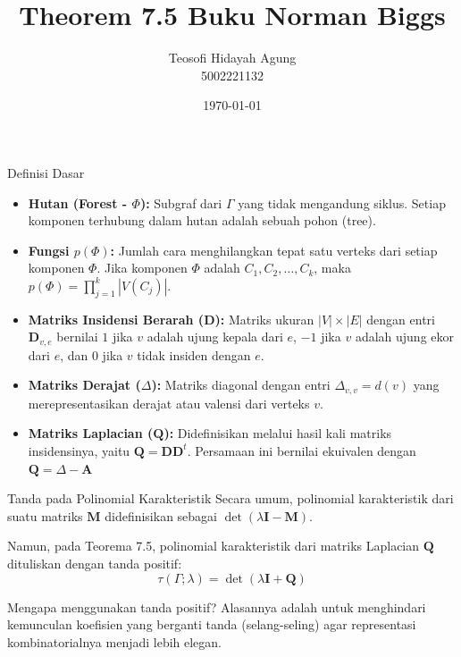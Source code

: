 \documentclass[aspectratio=169]{beamer}
\date{\today}
\title[Aljabar Graf]{Theorem 7.5 Buku Norman Biggs}
\author[Teosofi H.\ A.]{Teosofi Hidayah Agung \\ 5002221132}
\institute[Matematika ITS]{Departemen Matematika\\ Institut Teknologi Sepuluh Nopember}
\begin{document}
\frame{\titlepage}

\begin{frame}{Definisi Dasar}
  \begin{itemize}
    \item \textbf{Hutan (Forest - $\Phi$):} Subgraf dari $\Gamma$ yang tidak mengandung siklus. Setiap komponen terhubung dalam hutan adalah sebuah pohon (tree).
    \item \textbf{Fungsi $p(\Phi)$:} Jumlah cara menghilangkan tepat satu verteks dari setiap komponen $\Phi$. Jika komponen $\Phi$ adalah $C_1, C_2, \dots, C_k$, maka $p(\Phi) = \prod_{j=1}^k |V(C_j)|$.
    \item \textbf{Matriks Insidensi Berarah ($\mathbf{D}$):}
          Matriks ukuran $|V| \times |E|$ dengan entri $\mathbf{D}_{v,e}$ bernilai $1$ jika $v$ adalah ujung kepala dari $e$, $-1$ jika $v$ adalah ujung ekor dari $e$, dan $0$ jika $v$ tidak insiden dengan $e$.
    \item \textbf{Matriks Derajat ($\Delta$):}
          Matriks diagonal dengan entri $\Delta_{v,v} = d(v)$ yang merepresentasikan derajat atau valensi dari verteks $v$.
    \item \textbf{Matriks Laplacian ($\mathbf{Q}$):}
          Didefinisikan melalui hasil kali matriks insidensinya, yaitu $\mathbf{Q} = \mathbf{D}\mathbf{D}^t$. Persamaan ini bernilai ekuivalen dengan
          $ \mathbf{Q} = \Delta - \mathbf{A} $
  \end{itemize}

\end{frame}

\begin{frame}{Tanda pada Polinomial Karakteristik}
  Secara umum, polinomial karakteristik dari suatu matriks $\mathbf{M}$ didefinisikan sebagai $\det(\lambda \mathbf{I} - \mathbf{M})$.

  \vspace{0.5cm}
  Namun, pada Teorema 7.5, polinomial karakteristik dari matriks Laplacian $\mathbf{Q}$ dituliskan dengan tanda positif:
  $$ \tau(\Gamma; \lambda) = \det(\lambda \mathbf{I} + \mathbf{Q}) $$

  \vspace{0.5cm}
  Mengapa menggunakan tanda positif? Alasannya adalah untuk menghindari kemunculan koefisien yang berganti tanda (selang-seling) agar representasi kombinatorialnya menjadi lebih elegan.
\end{frame}
\end{document}
